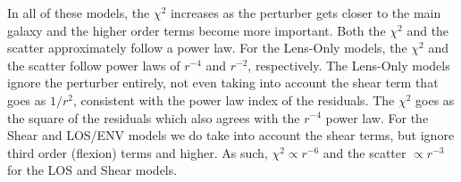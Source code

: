 In all of these models, the $\chi^2$ increases as the perturber gets closer to the main galaxy and the higher order terms become more important. Both the $\chi^2$ and the scatter approximately follow a power law. For the Lens-Only models, the $\chi^2$ and the scatter follow power laws of $r^{-4}$ and $r^{-2}$, respectively. The Lens-Only models ignore the perturber entirely, not even taking into account the shear term that goes as $1/r^2$, consistent with the power law index of the residuals. The $\chi^2$ goes as the square of the residuals which also agrees with the $r^{-4}$ power law. For the Shear and LOS/ENV models we do take into account the shear terms, but ignore third order (flexion) terms and higher. As such, $\chi^2 \propto r^{-6}$ and the scatter $\propto r^{-3}$ for the LOS and Shear models.